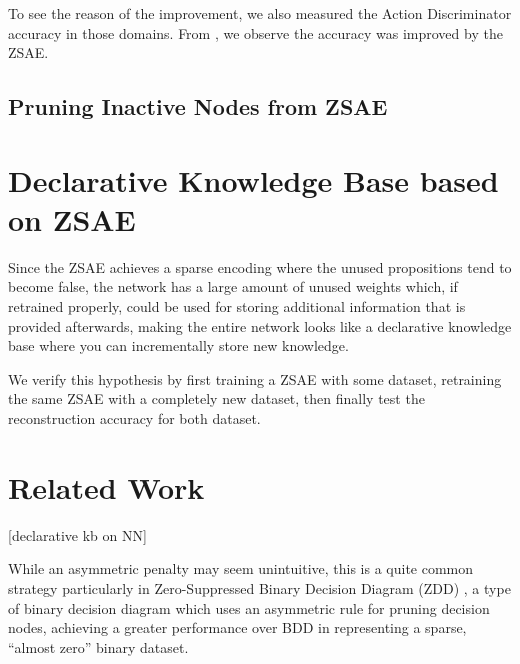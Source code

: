 \begin{table}[htb]
 \vspace{2in}
 \caption{}
 \label{tab:ama2}
\end{table}

To see the reason of the improvement, we also measured the Action Discriminator accuracy in those domains.
From , we observe the accuracy was improved by the ZSAE.

\begin{figure}[htb]
 \vspace{2in}
 \caption{}
 \label{fig:ama2-ad}
\end{figure}

\subsection{Pruning Inactive Nodes from ZSAE}

\section{Declarative Knowledge Base based on ZSAE}

Since the ZSAE achieves a sparse encoding where the unused propositions
tend to become false, the network has a large amount of unused weights
which, if retrained properly, could be used for storing additional
information that is provided afterwards, making the entire network looks
like a declarative knowledge base where you can incrementally store
new knowledge.

We verify this hypothesis by first training a ZSAE with some dataset, retraining the same ZSAE with
a completely new dataset, then finally test the reconstruction accuracy for both dataset.

\section{Related Work}


[declarative kb on NN]




While an asymmetric penalty may seem unintuitive, this is a quite common
strategy particularly in Zero-Suppressed Binary Decision Diagram (ZDD)
\cite{minato1993zero}, a type of binary decision diagram \cite{bryant1986graph} which
uses an asymmetric rule for pruning decision nodes, achieving a greater
performance over BDD in representing a sparse, ``almost zero'' binary dataset.

